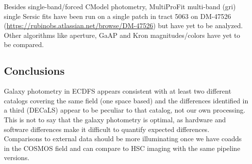 Besides single-band/forced CModel photometry, MultiProFit multi-band (gri) single Sersic fits have been run on a single patch in tract 5063 on DM-47526 (\url{https://rubinobs.atlassian.net/browse/DM-47526}) but have yet to be analyzed.
Other algorithms like aperture, GaAP and Kron magnitudes/colors have yet to be compared.

\subsection{Conclusions}
\label{subsec:galaxy_photometry_conclusions}

Galaxy photometry in ECDFS appears consistent with at least two different catalogs covering the same field (one space based) and the differences identified in a third (DECaLS) appear to be peculiar to that catalog, not our own processing.
This is not to say that the galaxy photometry is optimal, as hardware and software differences make it difficult to quantify expected differences.
Comparisons to external data should be more illuminating once we have coadds in the COSMOS field and can compare to HSC imaging with the same pipeline versions.
